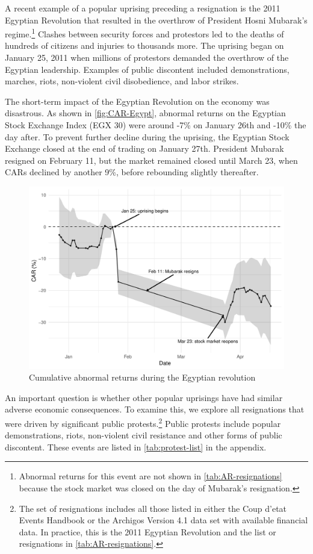 \documentclass[12pt,final,fleqn]{article}
\theoremstyle{plain}
\begin{document}
A recent example of a popular uprising preceding a resignation is the 2011 Egyptian Revolution that resulted in the overthrow of President Hosni Mubarak's regime.\footnote{Abnormal returns for this event are not shown in \autoref{tab:AR-resignations} because the stock market was closed on the day of Mubarak's resignation.} Clashes between security forces and protestors led to the deaths of hundreds of citizens and injuries to thousands more. The uprising began on January 25, 2011 when millions of protestors demanded the overthrow of the Egyptian leadership. Examples of public discontent included demonstrations, marches, riots, non-violent civil disobedience, and labor strikes.

The short-term impact of the Egyptian Revolution on the economy was disastrous. As shown in \autoref{fig:CAR-Egypt}, abnormal returns on the Egyptian Stock Exchange Index (EGX 30) were around -7\% on January 26th and -10\% the day after. To prevent further decline during the uprising, the Egyptian Stock Exchange closed at the end of trading on January 27th. President Mubarak resigned on February 11, but the market remained closed until March 23, when CARs declined by another 9\%, before rebounding slightly thereafter.

\begin{figure}[!ht]
\includegraphics{../figs/egypt-revolution-2011.pdf}
\caption{Cumulative abnormal returns during the Egyptian revolution}
\label{fig:CAR-Egypt}
\end{figure}

An important question is whether other popular uprisings have had similar adverse economic consequences. To examine this, we explore all resignations that were driven by significant public protests.\footnote{The set of resignations includes all those listed in either the Coup d'etat Events Handbook or the Archigos Version 4.1 data set with available financial data. In practice, this is the 2011 Egyptian Revolution and the list or resignations in \autoref{tab:AR-resignations}.} Public protests include popular demonstrations, riots, non-violent civil resistance and other forms of public discontent. These events are listed in \autoref{tab:protest-list} in the appendix.
\end{document}
